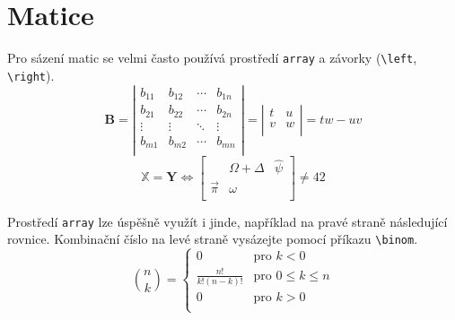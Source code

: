 \documentclass[twocolumn,a4paper,11pt]{article}
\begin{document}
\section{Matice}
\label{sec:matice}
Pro sázení matic se velmi často používá prostředí \verb|array| a závorky (\verb|\left|, \verb|\right|).
\[
\mathbf{B} = \left|
\begin{array}{cccc}
    b_{11} & b_{12} & \cdots & b_{1n} \\
    b_{21} & b_{22} & \cdots & b_{2n} \\
    \vdots & \vdots & \ddots & \vdots \\
    b_{m1} & b_{m2} & \cdots & b_{mn} \\
\end{array}
\right|
= \left|\begin{array}{cc}
    t & u \\
    v & w \\
\end{array}
\right| = tw-uv
\]
\[
\mathbb{X} = \mathbf{Y} \Longleftrightarrow \left[
\begin{array}{ccc}
    & \Omega + \Delta & \hat{\psi} \\
    \vec{\pi} & \omega & \\
\end{array}
\right] \neq 42
\]
\par Prostředí \verb|array| lze úspěšně využít i jinde, například na pravé straně následující rovnice.
Kombinační číslo na levé straně vysázejte pomocí příkazu \verb|\binom|.
\[
\binom{n}{k} = \left\{ 
\begin{array}{cl}
    0 & \text{pro } k<0 \\
    \frac{n!}{k!(n-k)!} & \text{pro } 0\leq k \leq n \\
    0 & \text{pro } k>0 \\
\end{array}
\right.
\]
\end{document}

